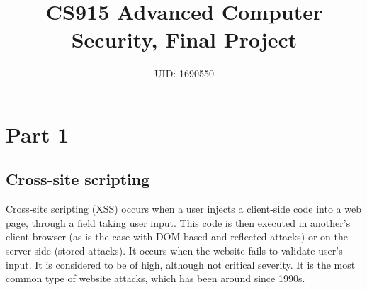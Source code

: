 \documentclass[11pt,journal]{article}
\begin{document}
	\title{CS915 Advanced Computer Security, Final Project}
	
	\author{UID: 1690550}%
	



	
	
	\maketitle
	
	
	
	
	\section{Part 1}
	\subsection{Cross-site scripting}
	Cross-site scripting (XSS) occurs when a user injects a client-side code into a web page, through a field taking user input. This code is then executed in another's client browser (as is the case with DOM-based and reflected attacks) or on the server side (stored attacks). It occurs when the website fails to validate user's input. It is considered to be of high, although not critical severity\cite{xss review}. It is the most common type of website attacks, which has been around since 1990s\cite{xss2}.
	
\end{document}
